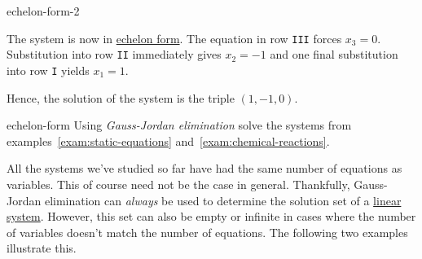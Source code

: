 \begin{example}{}{echelon-form-2}
\begin{center}
 \end{center}
 The system is now in \hyperref[def:echelon-form]{echelon form}. The equation in
 row \texttt{III} forces $x_3 = 0$. Substitution into row \texttt{II}
 immediately gives $x_2 = -1$ and one final substitution into row \texttt{I}
 yields $x_1 = 1$.

 Hence, the solution of the system is the triple $(1, -1, 0)$.
\end{example}

\begin{exercise}{}{echelon-form}
 Using \emph{Gauss-Jordan elimination} solve the systems from
 examples~\ref{exam:static-equations} and~\ref{exam:chemical-reactions}.
\end{exercise}

All the systems we've studied so far have had the same number of equations as
variables. This of course need not be the case in general. Thankfully,
Gauss-Jordan elimination can \emph{always} be used to determine the solution set
of a \hyperref[def:linear-system]{linear system}. However, this set can also be
empty or infinite in cases where the number of variables doesn't match the
number of equations. The following two examples illustrate this.


